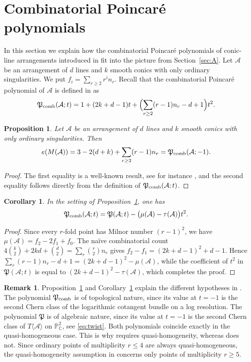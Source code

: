 \documentclass[11pt]{amsart}
\newtheorem{proposition}[theorem]{Proposition}
\newtheorem{corollary}[theorem]{Corollary}
\theoremstyle{definition}
\newtheorem{remark}[theorem]{Remark}
\numberwithin{equation}{section}
\newcommand{\PP}{\mathbb{P}}
\newcommand{\CC}{\mathbb{C}}
\newcommand{\cA}{\mathcal{A}}
\newcommand{\Pfrak}{\mathfrak{P}}
\newcommand{\Pcomb}{\mathfrak{P}_{\rm comb}}
\newcommand{\gdel}[1]{}
\begin{document}
\section{Combinatorial Poincar\'e polynomials}\label{sec:comb}

In this section we explain how the combinatorial Poincar\'e polynomials of conic-line arrangements introduced in \cite{Po25} fit into the picture from Section~\ref{sec:A}.
Let $\cA$ be an arrangement of $d$ lines and $k$ smooth conics with only ordinary singularities.
We put $f_i=\sum_{r\ge2}r^in_r$.
Recall that the combinatorial Poincar\'e polynomial of $\cA$ is defined in \cite{Po25} as
\[
\Pcomb(\cA;t)=1+(2k+d-1)t+\Bigl(\sum_{r\ge2}(r-1)n_r-d+1\Bigr)t^2 .
\]

\begin{proposition}\label{prop:comb}
Let $\cA$ be an arrangement of $d$ lines and $k$ smooth conics with only ordinary singularities. Then
\[
e(M(\cA))=3-2(d+k)+\sum_{r\ge2}(r-1)n_r=\Pcomb(\cA;-1).
\]
\end{proposition}

\begin{proof}
The first equality is a well-known result, see for instance \cite[Section 1.2]{ST}, and the second equality follows directly from the definition of $\Pcomb(\cA;t)$.
\end{proof}

\begin{corollary}\label{cor:comb}
In the setting of Proposition~\ref{prop:comb}, one has
\[
\Pcomb(\cA;t)=\Pfrak(\cA;t)-\bigl(\mu(\cA)-\tau(\cA)\bigr)t^2 .
\]
\end{corollary}

\begin{proof}
Since every $r$-fold point has Milnor number $(r-1)^2$, we have $\mu(\cA)=f_2-2f_1+f_0$.
The na\"ive combinatorial count $4\binom k2+2kd+\binom d2=\sum_r\binom r2n_r$ gives $f_2-f_1=(2k+d-1)^2+d-1$.
Hence $\sum_r(r-1)n_r-d+1=(2k+d-1)^2-\mu(\cA)$, while the coefficient of $t^2$ in $\Pfrak(\cA;t)$ is equal to $(2k+d-1)^2-\tau(\cA)$\gdel{l}, which completes the proof.
\end{proof}

\begin{remark}
Proposition~\ref{prop:comb} and Corollary~\ref{cor:comb} explain the different hypotheses in \cite{Po25}.
The polynomial $\Pcomb$ is of topological nature, since its value at $t=-1$ is the second Chern class of the logarithmic cotangent bundle on a log resolution.
The polynomial $\Pfrak$ is of algebraic nature, since its value at $t=-1$ is the second Chern class of $T\langle\cA\rangle$ on $\PP^2_\CC$, see \eqref{eq:twist}.
Both polynomials coincide exactly in the quasi-homogeneous case.
This is why \cite[Theorem~1.5]{Po25} requires quasi-homogeneity, whereas \cite[Remark~3.5]{Po25} does not.
Since ordinary points of multiplicity $r\le4$ are always quasi-homogeneous, the quasi-homogeneity assumption in \cite[Theorem~1.5]{Po25} concerns only points of multiplicity $r\ge5$.
\end{remark}
\end{document}
